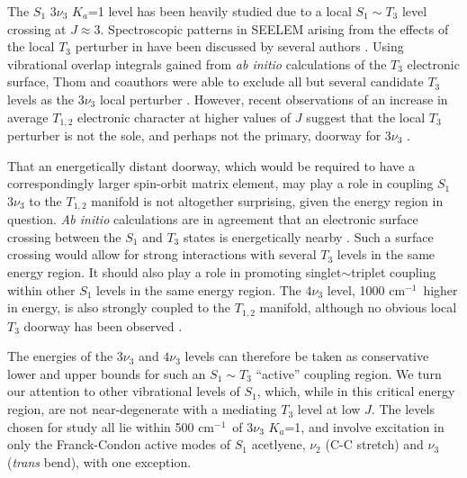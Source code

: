 \documentclass[12pt]{mitthesis}
\newcommand{\POINT}[1]{\textcolor{magenta}{#1}}
\newcommand{\rcm}{cm$^{-1}$}
\begin{document}
The $S_1$ $3 \nu_3$ $K_a$=1 level has been heavily studied due to a
local $S_1 \sim T_3$ level crossing at $J \approx 3$.  Spectroscopic
patterns in SEELEM arising from the effects of the local $T_3$
perturber in have been discussed by several authors \cite{humphrey97,
  altunata00, altunata01, mishra04}.  Using vibrational overlap
integrals gained from \emph{ab initio} calculations of the $T_3$
electronic surface, Thom and coauthors were able to exclude all but
several candidate $T_3$ levels as the $3\nu_3$ local perturber
\cite{thom07}.
However, recent observations of an increase in average $T_{1,2}$
electronic character at higher values of $J$ suggest that the local
$T_3$ perturber is not the sole, and perhaps not the primary, doorway
for $3 \nu_3$ \cite{degroot07}.

That an energetically distant doorway, which would be required to have
a correspondingly larger spin-orbit matrix element, may play a role in
coupling $S_1$ $3 \nu_3$ to the $T_{1,2}$ manifold is not altogether
surprising, given the energy region in question.  \emph{Ab initio}
calculations are in agreement that an electronic surface crossing
between the $S_1$ and $T_3$ states is energetically nearby
\cite{ventura03, thom07}.  Such a surface crossing would allow for
strong interactions with several $T_3$ levels in the same energy
region.  It should also play a role in promoting singlet$\sim$triplet
coupling within other $S_1$ levels in the same energy region.  The
$4\nu_3$ level, 1000 \rcm\ higher in energy, is also strongly coupled
to the $T_{1,2}$ manifold, although no obvious local $T_3$ doorway has
been observed \cite{drabbels93, ochi91}.

The energies of the $3 \nu_3$ and $4\nu_3$ levels can therefore be
taken as conservative lower and upper bounds for such an $S_1 \sim
T_3$ ``active'' coupling region.  We turn our attention to other
vibrational levels of $S_1$, which, while in this critical energy
region, are not near-degenerate with a mediating $T_3$ level at low
$J$.  The levels chosen for study all lie within 500 \rcm\ of $3
\nu_3$ $K_a$=1, and involve excitation in only the Franck-Condon
active modes of $S_1$ acetlyene, $\nu_2$ (C-C stretch) and $\nu_3$
(\emph{trans} bend), with one exception.
\end{document}
